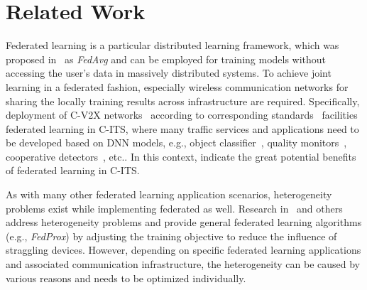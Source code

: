 \section{Related Work}
\label{sec:related_work}
\vspace{-1mm}
Federated learning is a particular distributed learning framework, which was proposed in~\cite{pmlr-v54-mcmahan17a} as \emph{FedAvg} and can be employed for training models without accessing the user's data in massively distributed systems. To achieve joint learning in a federated fashion, especially wireless communication networks for sharing the locally training results across infrastructure are required. Specifically, deployment of C-V2X networks~\cite{9128410, Festag2021,delooz2022analysis} according to corresponding standards~\cite{Festag-Commag, SongFISITA2021} facilities federated learning in C-ITS, where many traffic services and applications need to be developed based on DNN models, e.g., object classifier~\cite{ResNet}, quality monitors~\cite{zhou2021semml,song2022edge}, cooperative detectors~\cite{xu2021opv2v,xu2022v2xvit,chen2022model,zimmer2022real}, etc..
In this context, \cite{Posner2021_FL_V2X,FL_VehEdgeCloud,Elbir2020_FL_Veh} indicate the great potential benefits of federated learning in C-ITS.

As with many other federated learning application scenarios, heterogeneity problems exist while implementing federated as well. Research in~\cite{li2020federated, Elbir2020_FL_Veh, 9521822} and others address heterogeneity problems and provide general federated learning algorithms (e.g., \emph{FedProx}) by adjusting the training objective to reduce the influence of straggling devices. However, depending on specific federated learning applications and associated communication infrastructure, the heterogeneity can be caused by various %
reasons and needs to be optimized individually. 



